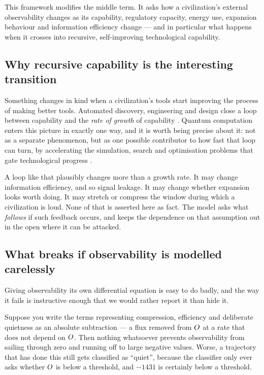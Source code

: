 This framework modifies the middle term. It asks how a civilization's external
observability changes as its capability, regulatory capacity, energy use,
expansion behaviour and information efficiency change --- and in particular what
happens when it crosses into recursive, self-improving technological capability.

\subsection{Why recursive capability is the interesting transition}

Something changes in kind when a civilization's tools start improving the
process of making better tools. Automated discovery, engineering and design
close a loop between capability and the \emph{rate of growth} of capability
\citep{good1965,bostrom2014,russell2019}. Quantum computation enters this
picture in exactly one way, and it is worth being precise about it: not as a
separate phenomenon, but as one possible contributor to how fast that loop can
turn, by accelerating the simulation, search and optimisation problems that gate
technological progress \citep{shor1994,nielsen2010,preskill2018}. \Speculative

A loop like that plausibly changes more than a growth rate. It may change
information efficiency, and so signal leakage. It may change whether expansion
looks worth doing. It may stretch or compress the window during which a
civilization is loud. None of that is asserted here as fact. The model asks what
\emph{follows} if such feedback occurs, and keeps the dependence on that
assumption out in the open where it can be attacked.

\subsection{What breaks if observability is modelled carelessly}

Giving observability its own differential equation is easy to do badly, and the
way it fails is instructive enough that we would rather report it than hide it.

Suppose you write the terms representing compression, efficiency and deliberate
quietness as an absolute subtraction --- a flux removed from $O$ at a rate
that does not depend on $O$. Then nothing whatsoever prevents observability
from sailing through zero and running off to large negative values. Worse, a
trajectory that has done this still gets classified as ``quiet'', because the
classifier only ever asks whether $O$ is below a threshold, and $-1431$ is
certainly below a threshold.

